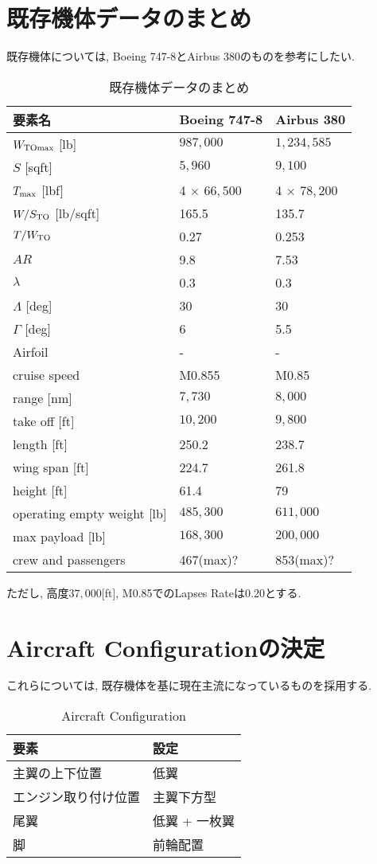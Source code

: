 \documentclass[12pt]{jsarticle}
\begin{document}
\section{既存機体データのまとめ}
既存機体については, Boeing 747-8とAirbus 380のものを参考にしたい.
\begin{table}[H]
	\caption{既存機体データのまとめ}
	\begin{center}
		\begin{tabular}{lll} \hline
			要素名 & Boeing 747-8 & Airbus 380 \\ \hline \hline
			$W_{\rm TOmax}$ [lb] & $987,000$ & $1,234,585$ \\
			$S$ [\rm sqft] & $5,960$ & $9,100$ \\
			$T_{\rm max}$ [lbf] & 4 $\times$ $66,500$ & 4 $\times$ $78,200$ \\
			$W/S_{\rm TO}$ [lb/sqft] & 165.5 & 135.7 \\
			$T/W_{\rm TO}$ & 0.27 & 0.253 \\
			$AR$ & 9.8 & 7.53 \\
			$\lambda$ & 0.3 & 0.3 \\
			$\Lambda$ [deg] & 30 & 30 \\
			$\Gamma$ [deg] & 6 & 5.5 \\
			Airfoil & - & - \\
			cruise speed & M0.855 & M0.85 \\
			range [nm] & $7,730$ & $8,000$ \\
			take off [ft] & $10,200$ & $9,800$ \\
			length [ft] & 250.2 & 238.7 \\
			wing span [ft] & 224.7 & 261.8 \\
			height [ft] & 61.4 & 79 \\
			operating empty weight [lb] & $485,300$ & $611,000$ \\
			max payload [lb] & $168,300$ & $200,000$ \\
			crew and passengers & 467(max)? & 853(max)? \\ \hline
		\end{tabular}
	\end{center}
\end{table}
ただし, 高度$37,000$[ft], M0.85でのLapses Rateは0.20とする.
\section{Aircraft Configurationの決定}
これらについては, 既存機体を基に現在主流になっているものを採用する.
\begin{table}[htb]
	\caption{Aircraft Configuration}
	\begin{center}
		\begin{tabular}{ll} \hline
			要素 & 設定 \\ \hline \hline
			主翼の上下位置 & 低翼 \\
			エンジン取り付け位置 & 主翼下方型 \\
			尾翼 & 低翼 + 一枚翼 \\
			脚 & 前輪配置 \\ \hline
		\end{tabular}
	\end{center}
\end{table}
\end{document}
